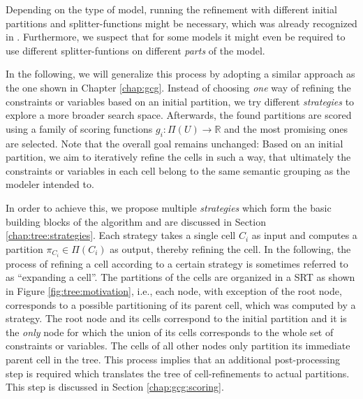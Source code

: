 		Depending on the type of model, running the refinement with different initial partitions and splitter-functions might be necessary, which was already recognized in \cite{salvagninDetectingSemanticGroups2016}.
		Furthermore, we suspect that for some models it might even be required to use different splitter-funtions on different \textit{parts} of the model.
		
		In the following, we will generalize this process by adopting a similar approach as the one shown in Chapter \ref{chap:gcg}. 
		Instead of choosing \textit{one} way of refining the constraints or variables based on an initial partition, we try different \textit{strategies} to explore a more broader search space.
		Afterwards, the found partitions are scored using a family of scoring functions $g_i: \Pi(U) \rightarrow \mathbb{R}$ and the most promising ones are selected.
		Note that the overall goal remains unchanged: Based on an initial partition, we aim to iteratively refine the cells in such a way, that ultimately the constraints or variables in each cell belong to the same semantic grouping as the modeler intended to.
		
		In order to achieve this, we propose multiple \textit{strategies} which form the basic building blocks of the algorithm and are discussed in Section \ref{chap:tree:strategies}.
		Each strategy takes a single cell $C_i$ as input and computes a partition $\pi_{C_i} \in \Pi(C_i)$ as output, thereby refining the cell.
		In the following, the process of refining a cell according to a certain strategy is sometimes referred to as \enquote{expanding a cell}.
		The partitions of the cells are organized in a \acf{SRT} as shown in Figure \ref{fig:tree:motivation}, i.e., each node, with exception of the root node, corresponds to a possible partitioning of its parent cell, which was computed by a strategy.
		The root node and its cells correspond to the initial partition and it is the \textit{only} node for which the union of its cells corresponds to the whole set of constraints or variables. The cells of all other nodes only partition its immediate parent cell in the tree.
		This process implies that an additional post-processing step is required which translates the tree of cell-refinements to actual partitions. This step is discussed in Section \ref{chap:gcg:scoring}.
		
